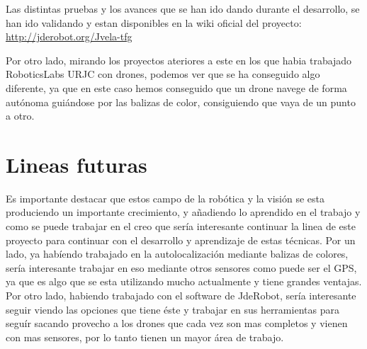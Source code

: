 \hspace{1cm} Las distintas pruebas y los avances que se han ido dando durante el desarrollo, se han ido validando y estan disponibles en la wiki oficial del proyecto:\\
\underline{\url{http://jderobot.org/Jvela-tfg}}

\hspace{1cm} Por otro lado, mirando los proyectos ateriores a este en los que habia trabajado RoboticsLabs URJC con drones, podemos ver que se ha conseguido algo diferente, ya que en este caso hemos conseguido que un drone navege de forma aut\'onoma gui\'andose por las balizas de color, consiguiendo que vaya de un punto a otro. 


\section{Lineas futuras}

\hspace{1cm}Es importante destacar que estos campo de la rob\'otica y la visi\'on se esta produciendo un importante crecimiento, y añadiendo lo aprendido en el trabajo y como se puede trabajar en el creo que ser\'ia interesante continuar la linea de este proyecto para continuar con el desarrollo y aprendizaje de estas t\'ecnicas. Por un lado, ya hab\'iendo trabajado en la autolocalizaci\'on mediante balizas de colores, ser\'ia interesante trabajar en eso mediante otros sensores como puede ser el GPS, ya que es algo que se esta utilizando mucho actualmente y tiene grandes ventajas. Por otro lado, habiendo trabajado con el software de JdeRobot, ser\'ia interesante seguir viendo las opciones que tiene \'este y trabajar en sus herramientas para segu\'ir sacando provecho a los drones que cada vez son mas completos y vienen con mas sensores, por lo tanto tienen un mayor \'area de trabajo. 





